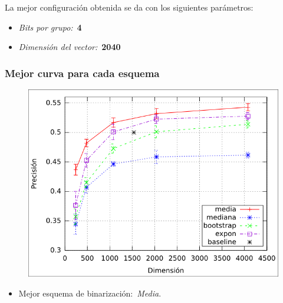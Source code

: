 		\begin{frame}
			La mejor configuración obtenida se da con los siguientes parámetros:
			\begin{itemize}
				\item<1-> \textit{Bits por grupo:}~\textbf{4}
				\item<2-> \textit{Dimensión del vector:}~\textbf{2040}
			\end{itemize}
		\end{frame}
		\begin{frame}
			\frametitle{Mejor curva para cada esquema}
			\begin{figure}[htbp!]
				\centering
				\centerline{
					\includegraphics[height=0.60\paperheight]{../img/resultados/reales/comparativa_metodos.png}
				}
			\end{figure}
			\begin{itemize}
				\centering
				\item<1-> Mejor esquema de binarización:~\textit{Media}.
			\end{itemize}
		\end{frame}
